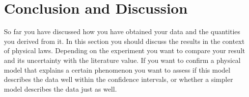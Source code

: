 \section{Conclusion and Discussion}

So far you have discussed how you have obtained your data and the
quantities you derived from it. In this section you should discuss
the results in the context of physical laws. Depending on the
experiment you want to compare your result and its uncertainty with
the literature value. If you want to confirm a physical model that
explains a certain phenomenon you want to assess if this model
describes the data well within the confidence intervals, or whether
a simpler model describes the data just as well.